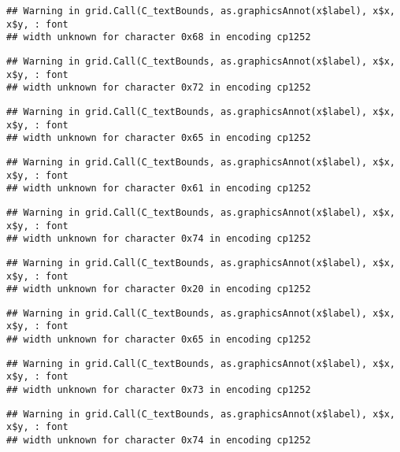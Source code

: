 \documentclass[
]{article}
\begin{document}
\begin{verbatim}
## Warning in grid.Call(C_textBounds, as.graphicsAnnot(x$label), x$x, x$y, : font
## width unknown for character 0x68 in encoding cp1252
\end{verbatim}

\begin{verbatim}
## Warning in grid.Call(C_textBounds, as.graphicsAnnot(x$label), x$x, x$y, : font
## width unknown for character 0x72 in encoding cp1252
\end{verbatim}

\begin{verbatim}
## Warning in grid.Call(C_textBounds, as.graphicsAnnot(x$label), x$x, x$y, : font
## width unknown for character 0x65 in encoding cp1252
\end{verbatim}

\begin{verbatim}
## Warning in grid.Call(C_textBounds, as.graphicsAnnot(x$label), x$x, x$y, : font
## width unknown for character 0x61 in encoding cp1252
\end{verbatim}

\begin{verbatim}
## Warning in grid.Call(C_textBounds, as.graphicsAnnot(x$label), x$x, x$y, : font
## width unknown for character 0x74 in encoding cp1252
\end{verbatim}

\begin{verbatim}
## Warning in grid.Call(C_textBounds, as.graphicsAnnot(x$label), x$x, x$y, : font
## width unknown for character 0x20 in encoding cp1252
\end{verbatim}

\begin{verbatim}
## Warning in grid.Call(C_textBounds, as.graphicsAnnot(x$label), x$x, x$y, : font
## width unknown for character 0x65 in encoding cp1252
\end{verbatim}

\begin{verbatim}
## Warning in grid.Call(C_textBounds, as.graphicsAnnot(x$label), x$x, x$y, : font
## width unknown for character 0x73 in encoding cp1252
\end{verbatim}

\begin{verbatim}
## Warning in grid.Call(C_textBounds, as.graphicsAnnot(x$label), x$x, x$y, : font
## width unknown for character 0x74 in encoding cp1252
\end{verbatim}
\end{document}
